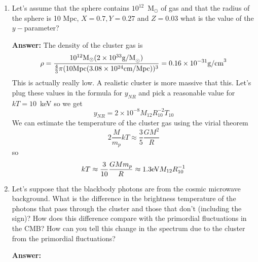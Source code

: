 \documentclass{article}
\newcommand{\rmmat}[1]{\hbox{\rm #1}}
\begin{document}
\begin{enumerate}
\begin{enumerate}
{\bf Answer:}
The distance through the cluster is given by
\begin{equation}
l = 2 \sqrt{ R^2 - b^2}
\end{equation}
so the optical depth is
\begin{equation}
\tau_{es} = l n_e \sigma_T = 2\sqrt{R^2 - b^2} \frac{\rho}{2m_p} (1 +
X) \sigma_T
\end{equation}
so
\begin{equation}
y_{NR} = \frac{4kT}{mc^2} \tau_{es} =  \frac{4kT}{mc^2} \sqrt{R^2 - b^2} \frac{\rho}{m_p} (1 +
X) \sigma_T
\end{equation}
\item 
  Let's assume that the sphere contains $10^{12}$~M$_\odot$ of gas and
  that the radius of the sphere is 10 Mpc, $X=0.7, Y=0.27$ and
  $Z=0.03$ what is the value of the $y-$parameter?

{\bf Answer:}
The density of the cluster gas is 
\begin{equation}
\rho = \frac{10^{12}\rmmat{M}_\odot (2 \times
  10^{33}\rmmat{g/M}_\odot)}{\frac{4}{3} \pi
  (10\rmmat{Mpc}(3.08 \times 10^{24}\rmmat{cm/Mpc}))^3} = 0.16 \times
10^{-31} \rmmat{g/cm}^3
\end{equation}
This is actually really low.  A realistic cluster is more massive that
this.  Let's plug these values in the formula for $y_{NR}$ and pick a
reasonable value for $kT = 10$~keV so we get
\begin{equation}
y_{NR} = 2 \times 10^{-8} M_{12} R_{10}^{-2} T_{10}
\end{equation}
We can estimate the temperature of the cluster gas using the virial
theorem
\begin{equation}
2 \frac{M}{m_p} k T \approx \frac{3}{5} \frac{G M^2}{R}
\end{equation}
so
\begin{equation}
k T \approx \frac{3}{10} \frac{G M m_p}{R} \approx 1.3 \rmmat{eV}
M_{12} R_{10}^{-1}
\end{equation}
\item
  Let's suppose that the blackbody photons are from the cosmic
  microwave background.   What is the difference in the brightness 
  temperature of the photons that pass through the cluster and those
  that don't (including the sign)?   How does this difference compare
  with the primordial fluctuations in the CMB?  How can you tell this
  change in the spectrum due to the cluster from the primordial
  fluctuations? 

{\bf Answer:}


\end{enumerate}
\end{enumerate}
\end{document}
